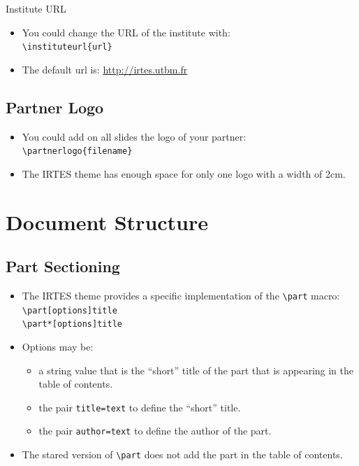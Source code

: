 \documentclass[english,circlenumberstyle]{irtesbeamer}
\begin{document}
\begin{frame}{Institute URL}
	\begin{itemize}
	\item You could change the URL of the institute with: \\
		\texttt{{\textbackslash}instituteurl\{url\}}
	\item The default url is: \url{http://irtes.utbm.fr}
	\end{itemize}
\end{frame}

\subsection{Partner Logo}
\begin{frame}{\subsecname}
	\begin{itemize}
	\item You could add on all slides the logo of your partner: \\
		\texttt{{\textbackslash}partnerlogo\{filename\}}
	\item The IRTES theme has enough space for only one logo with a width of 2cm.
	\end{itemize}
\end{frame}

\section{Document Structure}

\subsection{Part Sectioning}
\begin{frame}{\subsecname}
	\begin{itemize}
	\item The IRTES theme provides a specific implementation of the \texttt{{\textbackslash}part} macro: \\
		\texttt{{\textbackslash}part[options]{title}} \\
		\texttt{{\textbackslash}part*[options]{title}} \\
	\item Options may be: \begin{itemize}
		\item a string value that is the ``short'' title of the part that is appearing in the table of contents.
		\item the pair \texttt{title=text} to define the ``short'' title.
		\item the pair \texttt{author=text} to define the author of the part.
		\end{itemize}
	\item The stared version of \texttt{{\textbackslash}part} does not add the part in the table of contents.
	\end{itemize}
\end{frame}
\end{document}
